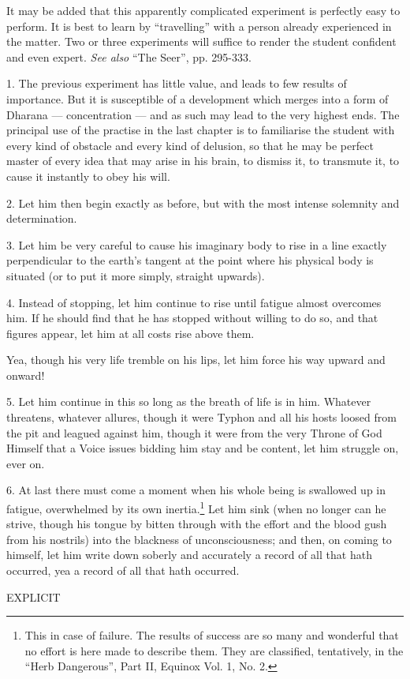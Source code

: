 It may be added that this apparently complicated experiment is perfectly easy to perform. It is best to learn by \enquote{travelling} with a person already experienced in the matter. Two or three experiments will suffice to render the student confident and even expert. \textit{See also} \enquote{The Seer}, pp. 295-333.




1. The previous experiment has little value, and leads to few results of importance. But it is susceptible of a development which merges into a form of Dharana --- concentration --- and as such may lead to the very highest ends. The principal use of the practise in the last chapter is to familiarise the student with every kind of obstacle and every kind of delusion, so that he may be perfect master of every idea that may arise in his brain, to dismiss it, to transmute it, to cause it instantly to obey his will.

2. Let him then begin exactly as before, but with the most intense solemnity and determination.

3. Let him be very careful to cause his imaginary body to rise in a line exactly perpendicular to the earth's tangent at the point where his physical body is situated (or to put it more simply, straight upwards).

4. Instead of stopping, let him continue to rise until fatigue almost overcomes him. If he should find that he has stopped without willing to do so, and that figures appear, let him at all costs rise above them.

Yea, though his very life tremble on his lips, let him force his way upward and onward!

5. Let him continue in this so long as the breath of life is in him. Whatever threatens, whatever allures, though it were Typhon and all his hosts loosed from the pit and leagued against him, though it were from the very Throne of God Himself that a Voice issues bidding him stay and be content, let him struggle on, ever on.

6. At last there must come a moment when his whole being is swallowed up in fatigue, overwhelmed by its own inertia.\footnote{This in case of failure. The results of success are so many and wonderful that no effort is here made to describe them. They are classified, tentatively, in the \enquote{Herb Dangerous}, Part II, Equinox Vol. 1, No. 2.} Let him sink (when no longer can he strive, though his tongue by bitten through with the effort and the blood gush from his nostrils) into the blackness of unconsciousness; and then, on coming to himself, let him write down soberly and accurately a record of all that hath occurred, yea a record of all that hath occurred.

{
\centering

\textsc{EXPLICIT}
\par
}
